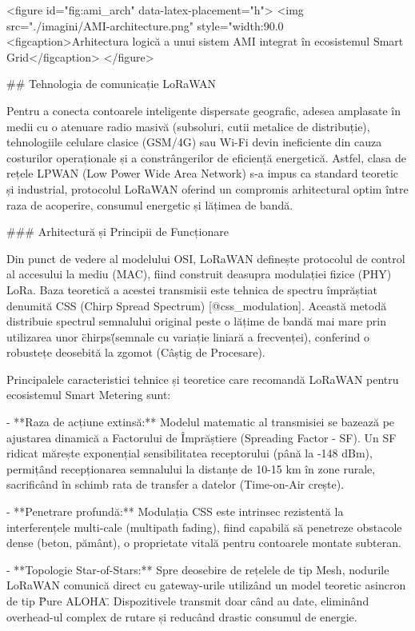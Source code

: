<figure id="fig:ami_arch" data-latex-placement="h">
<img src="./imagini/AMI-architecture.png" style="width:90.0%
<figcaption>Arhitectura logică a unui sistem AMI integrat în ecosistemul
Smart Grid</figcaption>
</figure>

## Tehnologia de comunicație LoRaWAN

Pentru a conecta contoarele inteligente dispersate geografic, adesea
amplasate în medii cu o atenuare radio masivă (subsoluri, cutii metalice
de distribuție), tehnologiile celulare clasice (GSM/4G) sau Wi-Fi devin
ineficiente din cauza costurilor operaționale și a constrângerilor de
eficiență energetică. Astfel, clasa de rețele LPWAN (Low Power Wide Area
Network) s-a impus ca standard teoretic și industrial, protocolul
LoRaWAN oferind un compromis arhitectural optim între raza de acoperire,
consumul energetic și lățimea de bandă.

### Arhitectură și Principii de Funcționare

Din punct de vedere al modelului OSI, LoRaWAN definește protocolul de
control al accesului la mediu (MAC), fiind construit deasupra modulației
fizice (PHY) LoRa. Baza teoretică a acestei transmisii este tehnica de
spectru împrăștiat denumită CSS (Chirp Spread Spectrum)
[@css_modulation]. Această metodă distribuie spectrul semnalului
original peste o lățime de bandă mai mare prin utilizarea unor
\"chirps\" (semnale cu variație liniară a frecvenței), conferind o
robustețe deosebită la zgomot (Câștig de Procesare).

Principalele caracteristici tehnice și teoretice care recomandă LoRaWAN
pentru ecosistemul Smart Metering sunt:

- **Raza de acțiune extinsă:** Modelul matematic al transmisiei se
  bazează pe ajustarea dinamică a Factorului de Împrăștiere (Spreading
  Factor - SF). Un SF ridicat mărește exponențial sensibilitatea
  receptorului (până la -148 dBm), permițând recepționarea semnalului la
  distanțe de 10-15 km în zone rurale, sacrificând în schimb rata de
  transfer a datelor (Time-on-Air crește).

- **Penetrare profundă:** Modulația CSS este intrinsec rezistentă la
  interferențele multi-cale (multipath fading), fiind capabilă să
  penetreze obstacole dense (beton, pământ), o proprietate vitală pentru
  contoarele montate subteran.

- **Topologie Star-of-Stars:** Spre deosebire de rețelele de tip Mesh,
  nodurile LoRaWAN comunică direct cu gateway-urile utilizând un model
  teoretic asincron de tip \"Pure ALOHA\". Dispozitivele transmit doar
  când au date, eliminând overhead-ul complex de rutare și reducând
  drastic consumul de energie.

